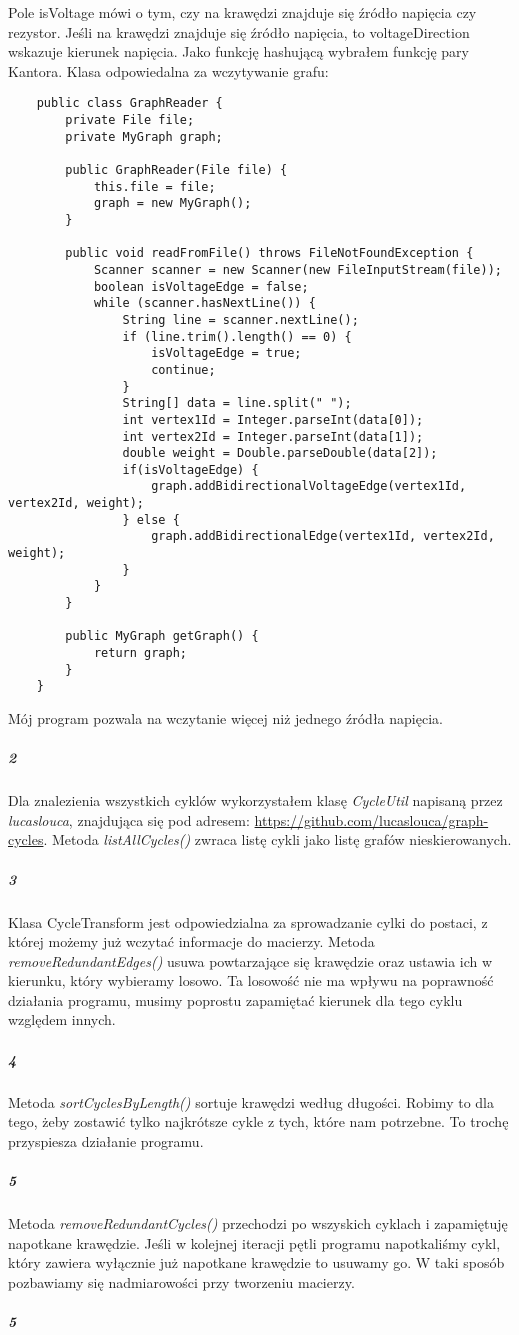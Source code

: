 \documentclass[12pt,a4paper]{article}
\begin{document}
Pole isVoltage mówi o tym, czy na krawędzi znajduje się źródło napięcia czy
rezystor. Jeśli na krawędzi znajduje się źródło napięcia, to voltageDirection
wskazuje kierunek napięcia. \newline
Jako funkcję hashującą wybrałem funkcję pary Kantora. \newline
Klasa odpowiedalna za wczytywanie grafu:
\begin{Verbatim}
    public class GraphReader {
        private File file;
        private MyGraph graph;

        public GraphReader(File file) {
            this.file = file;
            graph = new MyGraph();
        }

        public void readFromFile() throws FileNotFoundException {
            Scanner scanner = new Scanner(new FileInputStream(file));
            boolean isVoltageEdge = false;
            while (scanner.hasNextLine()) {
                String line = scanner.nextLine();
                if (line.trim().length() == 0) {
                    isVoltageEdge = true;
                    continue;
                }
                String[] data = line.split(" ");
                int vertex1Id = Integer.parseInt(data[0]);
                int vertex2Id = Integer.parseInt(data[1]);
                double weight = Double.parseDouble(data[2]);
                if(isVoltageEdge) {
                    graph.addBidirectionalVoltageEdge(vertex1Id, vertex2Id, weight);
                } else {
                    graph.addBidirectionalEdge(vertex1Id, vertex2Id, weight);
                }
            }
        }

        public MyGraph getGraph() {
            return graph;
        }
    }
\end{Verbatim}
Mój program pozwala na wczytanie więcej niż jednego źródła napięcia.
\subparagraph{2} Dla znalezienia wszystkich cyklów wykorzystałem klasę \emph{CycleUtil}
napisaną przez \mbox{\emph{lucaslouca}}, znajdująca się pod adresem:
\url{https://github.com/lucaslouca/graph-cycles}. Metoda \emph{listAllCycles()} zwraca
listę cykli jako listę grafów nieskierowanych.
\subparagraph{3} Klasa CycleTransform jest odpowiedzialna za sprowadzanie cylki
do postaci, z której możemy już wczytać informacje do macierzy. \newline
Metoda \emph{removeRedundantEdges()} usuwa powtarzające się krawędzie oraz ustawia ich
w kierunku, który wybieramy losowo. Ta losowość nie ma wpływu na poprawność
działania programu, musimy poprostu zapamiętać kierunek dla tego cyklu względem
innych.
\subparagraph{4} Metoda \emph{sortCyclesByLength()} sortuje krawędzi według długości. Robimy to
dla tego, żeby zostawić tylko najkrótsze cykle z tych, które nam potrzebne. To
trochę przyspiesza działanie programu.
\subparagraph{5} Metoda \emph{removeRedundantCycles()} przechodzi po wszyskich cyklach i zapamiętuję
napotkane krawędzie. Jeśli w kolejnej iteracji pętli programu napotkaliśmy cykl,
który zawiera wyłącznie już napotkane krawędzie to usuwamy go. W taki sposób
pozbawiamy się nadmiarowości przy tworzeniu macierzy.
\subparagraph{5}
\end{document}
